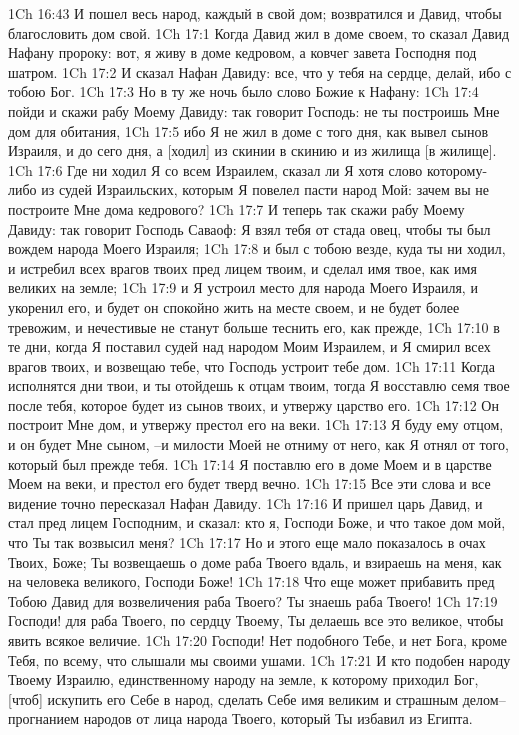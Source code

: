 1Ch 16:43  И пошел весь народ, каждый в свой дом; возвратился и Давид, чтобы благословить дом свой.
1Ch 17:1  Когда Давид жил в доме своем, то сказал Давид Нафану пророку: вот, я живу в доме кедровом, а ковчег завета Господня под шатром.
1Ch 17:2  И сказал Нафан Давиду: все, что у тебя на сердце, делай, ибо с тобою Бог.
1Ch 17:3  Но в ту же ночь было слово Божие к Нафану:
1Ch 17:4  пойди и скажи рабу Моему Давиду: так говорит Господь: не ты построишь Мне дом для обитания,
1Ch 17:5  ибо Я не жил в доме с того дня, как вывел сынов Израиля, и до сего дня, а [ходил] из скинии в скинию и из жилища [в жилище].
1Ch 17:6  Где ни ходил Я со всем Израилем, сказал ли Я хотя слово которому-либо из судей Израильских, которым Я повелел пасти народ Мой: зачем вы не построите Мне дома кедрового?
1Ch 17:7  И теперь так скажи рабу Моему Давиду: так говорит Господь Саваоф: Я взял тебя от стада овец, чтобы ты был вождем народа Моего Израиля;
1Ch 17:8  и был с тобою везде, куда ты ни ходил, и истребил всех врагов твоих пред лицем твоим, и сделал имя твое, как имя великих на земле;
1Ch 17:9  и Я устроил место для народа Моего Израиля, и укоренил его, и будет он спокойно жить на месте своем, и не будет более тревожим, и нечестивые не станут больше теснить его, как прежде,
1Ch 17:10  в те дни, когда Я поставил судей над народом Моим Израилем, и Я смирил всех врагов твоих, и возвещаю тебе, что Господь устроит тебе дом.
1Ch 17:11  Когда исполнятся дни твои, и ты отойдешь к отцам твоим, тогда Я восставлю семя твое после тебя, которое будет из сынов твоих, и утвержу царство его.
1Ch 17:12  Он построит Мне дом, и утвержу престол его на веки.
1Ch 17:13  Я буду ему отцом, и он будет Мне сыном, --и милости Моей не отниму от него, как Я отнял от того, который был прежде тебя.
1Ch 17:14  Я поставлю его в доме Моем и в царстве Моем на веки, и престол его будет тверд вечно.
1Ch 17:15  Все эти слова и все видение точно пересказал Нафан Давиду.
1Ch 17:16  И пришел царь Давид, и стал пред лицем Господним, и сказал: кто я, Господи Боже, и что такое дом мой, что Ты так возвысил меня?
1Ch 17:17  Но и этого еще мало показалось в очах Твоих, Боже; Ты возвещаешь о доме раба Твоего вдаль, и взираешь на меня, как на человека великого, Господи Боже!
1Ch 17:18  Что еще может прибавить пред Тобою Давид для возвеличения раба Твоего? Ты знаешь раба Твоего!
1Ch 17:19  Господи! для раба Твоего, по сердцу Твоему, Ты делаешь все это великое, чтобы явить всякое величие.
1Ch 17:20  Господи! Нет подобного Тебе, и нет Бога, кроме Тебя, по всему, что слышали мы своими ушами.
1Ch 17:21  И кто подобен народу Твоему Израилю, единственному народу на земле, к которому приходил Бог, [чтоб] искупить его Себе в народ, сделать Себе имя великим и страшным делом--прогнанием народов от лица народа Твоего, который Ты избавил из Египта.
